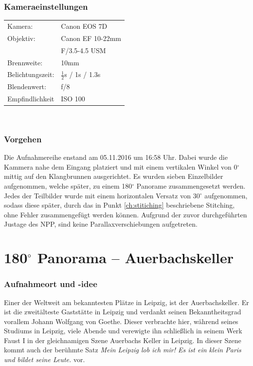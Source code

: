\documentclass[liststotoc,bibtotoc,fontsize=14pt,]{scrreprt}
\begin{document}
	
		\subsubsection{Kameraeinstellungen}
		\begin{minipage}{0.58\textwidth}
			\begin{tabular}{ll}
				Kamera: &Canon EOS 7D \\
				Objektiv: &Canon EF 10-22mm \\
				& F/3.5-4.5 USM\\		
				Brennweite:& 10mm \\
				Belichtungszeit: & $\frac{1}{2}$s / 1s / 1.3s\\
				Blendenwert: & f/8\\
				Empfindlichkeit & ISO 100 \\
			\end{tabular}\\
		\end{minipage}%
		\begin{minipage}{0.42\textwidth}

		\end{minipage}%
		
	\subsubsection{Vorgehen}
	 Die Aufnahmereihe enstand am 05.11.2016 um 16:58 Uhr. Dabei wurde die Kammera nahe dem Eingang platziert und mit einem vertikalen Winkel von 0$^\circ$ mittig auf den Klangbrunnen ausgerichtet. Es wurden sieben Einzelbilder aufgenommen, welche später, zu einem 180$^\circ$ Panorame zusammengesetzt werden. Jedes der Teilbilder wurde mit einem horizontalen Versatz von 30$^\circ$ aufgenommen, sodass diese später, durch das in Punkt \ref{ch:stitiching} beschriebene Stitching, ohne Fehler zusammengefügt werden können. Aufgrund der zuvor durchgeführten Justage des NPP, sind keine Parallaxverschiebungen aufgetreten.
	
	\section{180$^\circ$ Panorama -- Auerbachskeller}
	\label{sec:auer}
	\subsubsection{Aufnahmeort und -idee}
	Einer der Weltweit am bekanntesten Plätze in Leipzig, ist der Auerbachskeller. Er ist die zweitälteste Gaststätte in Leipzig und verdankt seinen Bekanntheitsgrad vorallem Johann Wolfgang von Goethe. Dieser verbrachte hier, während seines Studiums in Leipzig, viele Abende und verewigte ihn schließlich in seinem Werk Faust I in der gleichnamigen Szene \grqq{}Auerbachs Keller in Leipzig\grqq{}. In dieser Szene kommt auch der berühmte Satz \textit{\grqq{}Mein Leipzig lob ich mir! Es ist ein klein Paris und bildet seine Leute.\grqq{}} vor.
	
\end{document}
